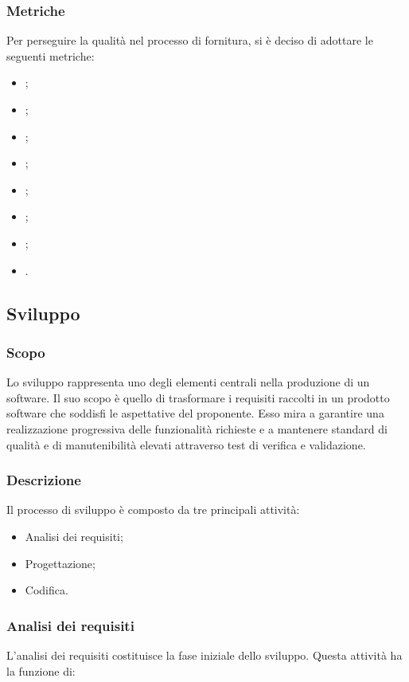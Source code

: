 \subsubsection{Metriche}
Per perseguire la qualità nel processo di fornitura, si è deciso di adottare le
seguenti metriche:
\begin{itemize}
    \item {};
    \item {};
    \item {};
    \item {};
    \item {};
    \item {};
    \item {};
    \item {}.
\end{itemize}

\subsection{Sviluppo}
\subsubsection{Scopo}
Lo sviluppo rappresenta uno degli elementi centrali nella produzione di un
software. Il suo scopo è quello di trasformare i requisiti raccolti in un
prodotto software che soddisfi le aspettative del proponente. Esso mira a garantire
una realizzazione progressiva delle funzionalità richieste e a mantenere 
standard di qualità e di manutenibilità elevati attraverso test di verifica e
validazione.

\subsubsection{Descrizione}
Il processo di sviluppo è composto da tre principali attività:
\begin{itemize}
    \item Analisi dei requisiti;
    \item Progettazione;
    \item Codifica.
\end{itemize}

\subsubsection{Analisi dei requisiti}
L'analisi dei requisiti costituisce la fase iniziale dello sviluppo. Questa
attività ha la funzione di:

